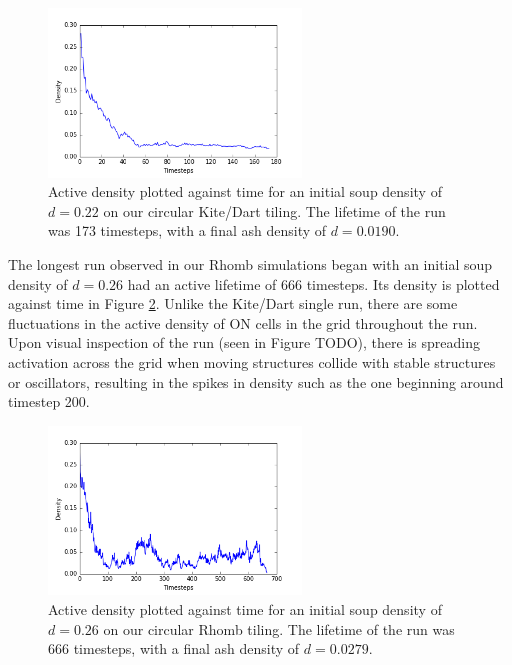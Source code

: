 \documentclass[a4paper,11pt,twoside]{report}
\begin{document}
\begin{figure}[htp]
\centering
\includegraphics[width=0.6\textwidth]{ch4_figs/ckd_173_density_lifetime}
\caption[Kite/Dart Single Run Density Graph]{
	Active density plotted against time for an initial soup density of $d=0.22$ on our circular Kite/Dart tiling. The lifetime of the run was 173 timesteps, with a final ash density of $d=0.0190$.
}
\label{fig:ckd_single}
\end{figure}

The longest run observed in our Rhomb simulations began with an initial soup density of $d=0.26$ had an active lifetime of 666 timesteps. Its density is plotted against time in Figure \ref{fig:crh_single}. Unlike the Kite/Dart single run, there are some fluctuations in the active density of ON cells in the grid throughout the run. Upon visual inspection of the run (seen in Figure TODO), there is spreading activation across the grid when moving structures collide with stable structures or oscillators, resulting in the spikes in density such as the one beginning around timestep 200.

\begin{figure}[htp]
\centering
\includegraphics[width=0.6\textwidth]{ch4_figs/crh_666_density_lifetime}
\caption[Rhomb Single Run Density Graph]{
	Active density plotted against time for an initial soup density of $d=0.26$ on our circular Rhomb tiling. The lifetime of the run was 666 timesteps, with a final ash density of $d=0.0279$.
}
\label{fig:crh_single}
\end{figure}
\end{document}

